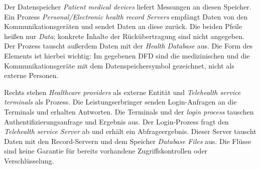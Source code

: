 \documentclass[a4paper,11pt]{article}
\begin{document}
Der Datenspeicher \emph{Patient medical devices} liefert Messungen an diesen Speicher.
Ein Prozess \emph{Personal/Electronic health record Servers} empfängt Daten von den Kommunikationsgeräten und sendet Daten an diese zurück.
Die beiden Pfeile heißen nur \emph{Data}; konkrete Inhalte der Rückübertragung sind nicht angegeben.
Der Prozess tauscht außerdem Daten mit der \emph{Health Database} aus.
Die Form des Elements ist hierbei wichtig: Im gegebenen DFD sind die medizinischen und die Kommunikationsgeräte
mit dem Datenspeichersymbol gezeichnet, nicht als externe Personen.

Rechts stehen \emph{Healthcare providers} als externe Entität und \emph{Telehealth service terminals} als Prozess.
Die Leistungserbringer senden Login-Anfragen an die Terminals und erhalten Antworten.
Die Terminals und der \emph{login process} tauschen Authentifizierungsanfrage und Ergebnis aus.
Der Login-Prozess fragt den \emph{Telehealth service Server} ab und erhält ein Abfrageergebnis.
Dieser Server tauscht Daten mit den Record-Servern und dem Speicher \emph{Database Files} aus.
Die Flüsse sind keine Garantie für bereits vorhandene Zugriffskontrollen oder Verschlüsselung.
\end{document}
